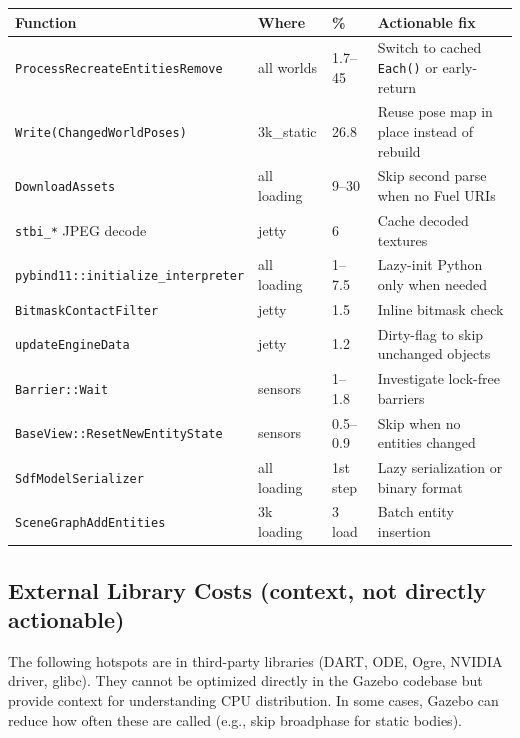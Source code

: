\documentclass[11pt, a4paper]{article}
\begin{document}
{\footnotesize
\begin{longtable}[]{@{}lll>{\raggedright\arraybackslash}p{\dimexpr\textwidth-10.5cm}@{}}
\toprule
Function & Where & \% & Actionable fix \\
\midrule
\endhead
\bottomrule
\endlastfoot
\texttt{ProcessRecreateEntitiesRemove} & all worlds & 1.7--45 & Switch to cached \texttt{Each()} or early-return \\
\texttt{Write(ChangedWorldPoses)} & 3k\_static & 26.8 & Reuse pose map in place instead of rebuild \\
\texttt{DownloadAssets} & all loading & 9--30 & Skip second parse when no Fuel URIs \\
\texttt{stbi\_*} JPEG decode & jetty & 6 & Cache decoded textures \\
\texttt{pybind11::initialize\_interpreter} & all loading & 1--7.5 & Lazy-init Python only when needed \\
\texttt{BitmaskContactFilter} & jetty & 1.5 & Inline bitmask check \\
\texttt{updateEngineData} & jetty & 1.2 & Dirty-flag to skip unchanged objects \\
\texttt{Barrier::Wait} & sensors & 1--1.8 & Investigate lock-free barriers \\
\texttt{BaseView::ResetNewEntityState} & sensors & 0.5--0.9 & Skip when no entities changed \\
\texttt{SdfModelSerializer} & all loading & 1st step & Lazy serialization or binary format \\
\texttt{SceneGraphAddEntities} & 3k loading & 3 load & Batch entity insertion \\
\end{longtable}
}

\clearpage
\subsection{External Library Costs (context, not directly actionable)}

The following hotspots are in third-party libraries (DART, ODE, Ogre, NVIDIA driver, glibc). They cannot be optimized directly in the Gazebo codebase but provide context for understanding CPU distribution. In some cases, Gazebo can reduce how often these are called (e.g., skip broadphase for static bodies).
\end{document}
